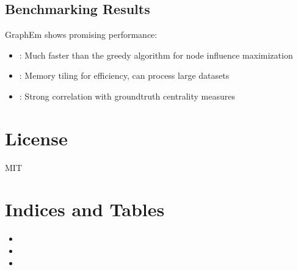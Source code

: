 \documentclass[letterpaper,10pt,english]{sphinxmanual}
\begin{document}
\section{Benchmarking Results}
\label{\detokenize{index:benchmarking-results}}
\sphinxAtStartPar
GraphEm shows promising performance:
\begin{itemize}
\item {} 
\sphinxAtStartPar
{}: Much faster than the greedy algorithm for node influence maximization

\item {} 
\sphinxAtStartPar
{}: Memory tiling for efficiency, can process large datasets

\item {} 
\sphinxAtStartPar
{}: Strong correlation with ground\sphinxhyphen{}truth centrality measures

\end{itemize}


\chapter{License}
\label{\detokenize{index:license}}
\sphinxAtStartPar
MIT


\chapter{Indices and Tables}
\label{\detokenize{index:indices-and-tables}}\begin{itemize}
\item {} 
\sphinxAtStartPar
{}

\item {} 
\sphinxAtStartPar
{}

\item {} 
\sphinxAtStartPar
{}

\end{itemize}



\renewcommand{\indexname}{Index}
\printindex
\end{document}
